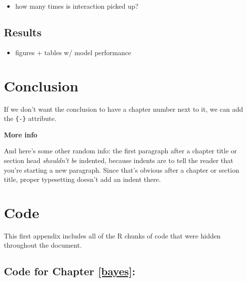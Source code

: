 \documentclass[12pt, twoside]{amherstthesis}
\providecommand{\tightlist}{%
  \setlength{\itemsep}{0pt}\setlength{\parskip}{0pt}}
\begin{document}
\begin{itemize}
\tightlist
\item
  how many times is interaction picked up?
\end{itemize}
\hypertarget{results}{%
\section{Results}\label{results}}
\begin{itemize}
\tightlist
\item
  figures + tables w/ model performance
\end{itemize}
\hypertarget{conclusion}{%
\chapter*{Conclusion}\label{conclusion}}

If we don't want the conclusion to have a chapter number next to it, we can add the \texttt{\{-\}} attribute.

\textbf{More info}

And here's some other random info: the first paragraph after a chapter title or section head \emph{shouldn't be} indented, because indents are to tell the reader that you're starting a new paragraph. Since that's obvious after a chapter or section title, proper typesetting doesn't add an indent there.

\appendix

\hypertarget{code}{%
\chapter{Code}\label{code}}

This first appendix includes all of the R chunks of code that were hidden throughout the document.

\hypertarget{code-for-chapter-refbayes}{%
\section{Code for Chapter \ref{bayes}:}\label{code-for-chapter-refbayes}}
\end{document}
